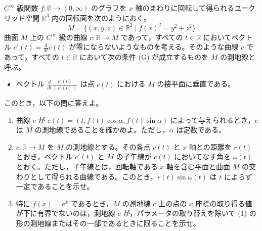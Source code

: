 \documentclass[12pt]{jlreq}
\begin{document}
$C^\infty$ 級関数 $f : \mathbb{R} \to (0, \infty)$ のグラフを $x$ 軸のまわりに回転して得られるユークリッド空間 $\mathbb{R}^3$ 内の回転面を次のようにおく。
\[
  M = \{ (x,y,z) \in \mathbb{R}^3 \mid f(x)^2 = y^2 + z^2 \}
\]
曲面 $M$ 上の $C^\infty$ 級の曲線 $c : \mathbb{R} \to M$ であって，すべての $t \in \mathbb{R}$ においてベクトル $c'(t) = \frac{d}{dt}c(t)$ が零にならないようなものを考える。そのような曲線 $c$ であって，すべての $t \in \mathbb{R}$ において次の条件 (G) が成立するものを $M$ の測地線と呼ぶ。
\begin{itemize}
  \item[(G)] ベクトル $\frac{d}{dt} \frac{c'(t)}{\|c'(t)\|}$ は点 $c(t)$ における $M$ の接平面に垂直である。
\end{itemize}
このとき，以下の問に答えよ。

\begin{enumerate}
  \item 曲線 $c$ が $c(t) = (t, f(t)\cos\alpha, f(t)\sin\alpha)$ によって与えられるとき，$c$ は $M$ の測地線であることを確かめよ。ただし，$\alpha$ は定数である。
  \item $c : \mathbb{R} \to M$ を $M$ の測地線とする。その各点 $c(t)$ と $x$ 軸との距離を $r(t)$ とおき，ベクトル $c'(t)$ と $M$ の子午線が $c(t)$ においてなす角を $\omega(t)$ とおく。ただし，子午線とは，回転軸である $x$ 軸を含む平面と曲面 $M$ の交わりとして得られる曲線である。このとき，$r(t)\sin\omega(t)$ は $t$ によらず一定であることを示せ。
  \item 特に $f(x) = e^x$ であるとき，$M$ の測地線 $c$ 上の点の $x$ 座標の取り得る値が下に有界でないのは，測地線 $c$ が，パラメータの取り替えを除いて (1) の形の測地線またはその一部であるときに限ることを示せ。
\end{enumerate}
\end{document}
